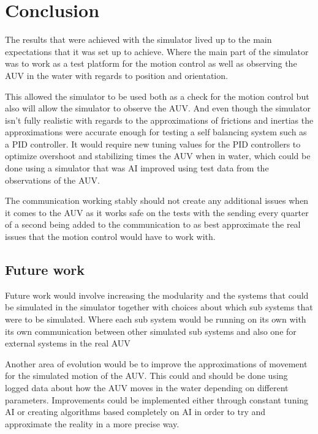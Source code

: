 \section{Conclusion}\label{sec:conclusion}
The results that were achieved with the simulator lived up to the main expectations that it was set up to achieve. Where the main part of the simulator was to work as a test platform for the motion control as well as observing the AUV in the water with regards to position and orientation.

This allowed the simulator to be used both as a check for the motion control but also will allow the simulator to observe the AUV. And even though the simulator isn’t fully realistic with regards to the approximations of frictions and inertias the approximations were accurate enough for testing a self balancing system such as a PID controller. It would require new tuning values for the PID controllers to optimize overshoot and stabilizing times the AUV when in water, which could be done using a simulator that was AI improved using test data from the observations of the AUV.

The communication working stably should not create any additional issues when it comes to the AUV as it works safe on the tests with the sending every quarter of a second being added to the communication to as best approximate the real issues that the motion control would have to work with.

\subsection{Future work}
Future work would involve increasing the modularity and the systems that could be simulated in the simulator together with choices about which sub systems that were to be simulated. Where each sub system would be running on its own with its own communication between other simulated sub systems and also one for external systems in the real AUV

Another area of evolution would be to improve the approximations of movement for the simulated motion of the AUV. This could and should be done using logged data about how the AUV moves in the water depending on different parameters. Improvements could be implemented either through constant tuning AI or creating algorithms based completely on AI in order to try and approximate the reality in a more precise way. 
